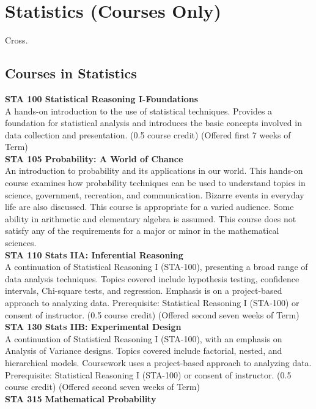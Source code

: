 \documentclass[
  letterpaper,
]{scrbook}
\begin{document}
\section{Statistics (Courses Only)}\label{statistics-courses-only}

Cross.

\subsection{Courses in Statistics}\label{courses-in-statistics}

\textbf{STA 100 Statistical Reasoning I-Foundations}\\
A hands-on introduction to the use of statistical techniques. Provides a
foundation for statistical analysis and introduces the basic concepts
involved in data collection and presentation. (0.5 course credit)
(Offered first 7 weeks of Term)\\
\textbf{STA 105 Probability: A World of Chance}\\
An introduction to probability and its applications in our world. This
hands-on course examines how probability techniques can be used to
understand topics in science, government, recreation, and communication.
Bizarre events in everyday life are also discussed. This course is
appropriate for a varied audience. Some ability in arithmetic and
elementary algebra is assumed. This course does not satisfy any of the
requirements for a major or minor in the mathematical sciences.\\
\textbf{STA 110 Stats IIA: Inferential Reasoning}\\
A continuation of Statistical Reasoning I (STA-100), presenting a broad
range of data analysis techniques. Topics covered include hypothesis
testing, confidence intervals, Chi-square tests, and regression.
Emphasis is on a project-based approach to analyzing data. Prerequisite:
Statistical Reasoning I (STA-100) or consent of instructor. (0.5 course
credit) (Offered second seven weeks of Term)\\
\textbf{STA 130 Stats IIB: Experimental Design}\\
A continuation of Statistical Reasoning I (STA-100), with an emphasis on
Analysis of Variance designs. Topics covered include factorial, nested,
and hierarchical models. Coursework uses a project-based approach to
analyzing data. Prerequisite: Statistical Reasoning I (STA-100) or
consent of instructor. (0.5 course credit) (Offered second seven weeks
of Term)\\
\textbf{STA 315 Mathematical Probability}\\
\end{document}
